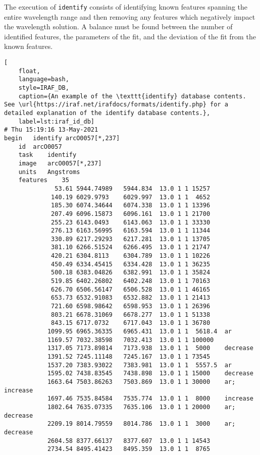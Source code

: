 The execution of \texttt{identify} consists of identifying known features spanning the entire wavelength range and then removing any features which negatively impact the wavelength solution.
A balance must be found between the number of identified features, the parameters of the fit, and the deviation of the fit from the known features.

\begin{lstlisting}[
    float,
    language=bash,
    style=IRAF_DB,
    caption={An example of the \texttt{identify} database contents. See \url{https://iraf.net/irafdocs/formats/identify.php} for a detailed explanation of the identify database contents.},
    label=lst:iraf_id_db]
# Thu 15:19:16 13-May-2021
begin	identify arcO0057[*,237]
    id	arcO0057
    task	identify
    image	arcO0057[*,237]
    units	Angstroms
    features	35
              53.61 5944.74989   5944.834  13.0 1 1 15257
             140.19 6029.9793    6029.997  13.0 1 1  4652
             185.30 6074.34644   6074.338  13.0 1 1 13396
             207.49 6096.15873   6096.161  13.0 1 1 21700
             255.23 6143.0493    6143.063  13.0 1 1 33330
             276.13 6163.56995   6163.594  13.0 1 1 11344
             330.89 6217.29293   6217.281  13.0 1 1 13705
             381.10 6266.51524   6266.495  13.0 1 1 21747
             420.21 6304.8113    6304.789  13.0 1 1 10226
             450.49 6334.45415   6334.428  13.0 1 1 36235
             500.18 6383.04826   6382.991  13.0 1 1 35824
             519.85 6402.26802   6402.248  13.0 1 1 70163
             626.70 6506.56147   6506.528  13.0 1 1 46165
             653.73 6532.91083   6532.882  13.0 1 1 21413
             721.60 6598.98642   6598.953  13.0 1 1 26396
             803.21 6678.31069   6678.277  13.0 1 1 51338
             843.15 6717.0732    6717.043  13.0 1 1 36780
            1099.95 6965.36335   6965.431  13.0 1 1  5618.4  ar
            1169.57 7032.38598   7032.413  13.0 1 1 100000
            1317.05 7173.89814   7173.938  13.0 1 1  5000    decrease
            1391.52 7245.11148   7245.167  13.0 1 1 73545
            1537.20 7383.93022   7383.981  13.0 1 1  5557.5  ar
            1595.02 7438.83545   7438.898  13.0 1 1 15000    decrease
            1663.64 7503.86263   7503.869  13.0 1 1 30000    ar; increase
            1697.46 7535.84584   7535.774  13.0 1 1  8000    increase
            1802.64 7635.07335   7635.106  13.0 1 1 20000    ar; decrease
            2209.19 8014.79559   8014.786  13.0 1 1  3000    ar; decrease
            2604.58 8377.66137   8377.607  13.0 1 1 14543
            2734.54 8495.41423   8495.359  13.0 1 1  8765

\end{lstlisting}
